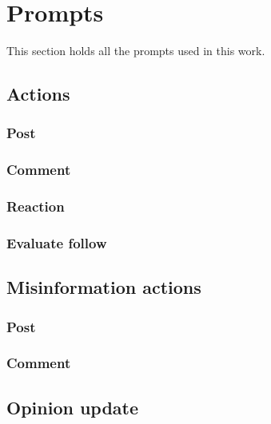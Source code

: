 \appendix

\section{Prompts}
\label{app:prompts}
This section holds all the prompts used in this work.

\subsection{Actions}
\label{app:prompt_actions}

\subsubsection{Post}


\subsubsection{Comment}


\subsubsection{Reaction}


\subsubsection{Evaluate follow}


\subsection{Misinformation actions}
\label{app:prompt_misinfo}

\subsubsection{Post}


\subsubsection{Comment}


\subsection{Opinion update}
\label{app:prompt_opinion}



